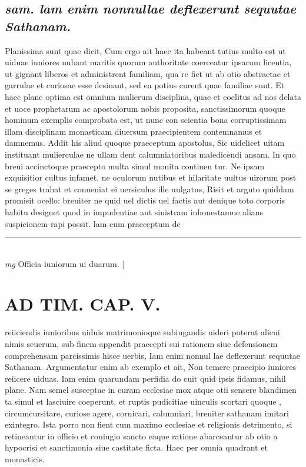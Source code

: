 \documentclass{article}
\begin{document}
\begin{pages}
\subsection*{\textit{sam. lam enim nonnullae deflexerunt sequutae Sathanam. }}\pstart Planissima sunt quae dicit, Cum ergo ait haec ita habeant tutius multo est ut uiduae iuniores nubant maritis quorum authoritate coerceatur ipsarum licentia, ut gignant liberos et administrent familiam, qua re fiet ut ab otio abstractae et garrulae et curiosae esse desinant, sed ea potius curent quae familiae sunt. Et haec plane optima est omnium mulierum disciplina, quae et coelitus ad nos delata et uoce prophetarum ac apostolorum nobis proposita, sanctissimorum quoque hominum exemplis comprobata est, ut nunc con scientia bona corruptissimam illam disciplinam monasticam diuersum praecipientem contemnamus et damnemus. Addit his aliud quoque praeceptum apostolus, Sic uidelicet uitam instituant mulierculae ne ullam dent calumniatoribus maledicendi ansam. In quo breui accinctoque praecepto multa simul monita continen tur. Ne ipsam exquisitior cultus infamet, ne oculorum nutibus et hilaritate uultus uirorum post se greges trahat et conueniat ei uersiculus ille uulgatus, Risit et arguto quiddam promisit ocello: breuiter ne quid uel dictis uel factis aut denique toto corporis habitu designet quod in impudentiae aut sinistram inhonestamue alians suspicionem rapi possit. lam cum praeceptum de  \pend
\vspace{0.5cm}\noindent
\vspace{0.2cm}\rule{1cm}{0.2pt}\\ 
\hspace{0.2cm}\textit{mg}
\footnotesize Officia iuniorum ui duarum. 
\normalsize| 
\section*{AD TIM. CAP. V. }
\marginpar{[ p.155 ]}\pstart reiiciendis iunioribus uiduis matrimonioque subiugandis uideri poterat alicui nimis seuerum, sub finem appendit praecepti sui rationem siue defensionem comprehensam parcissimis hisce uerbis, Iam enim nonnul lae deflexerunt sequutae Sathanam. Argumentatur enim ab exemplo et ait, Non temere praecipio iuniores reiicere uiduas. Iam enim quarundam perfidia do cuit quid ipsis fidamus, nihil plane. Nam semel susceptae in curam ecclesiae mox atque otii sensere blandimen ta simul et lasciuire coeperunt, et ruptis pudicitiae uinculis scortari quoque , circumcursitare, curiose agere, cornicari, calumniari, breuiter sathanam imitari exintegro. Ista porro non fient cum maximo ecclesiae et religionis detrimento, si retineantur in officio et coniugio sancto eaque ratione abarceantur ab otio a hypocrisi et sanctimonia siue castitate ficta. Haec per omnia quadrant et monasticis.  \pend
{}
{}

\end{pages}
\end{document}
